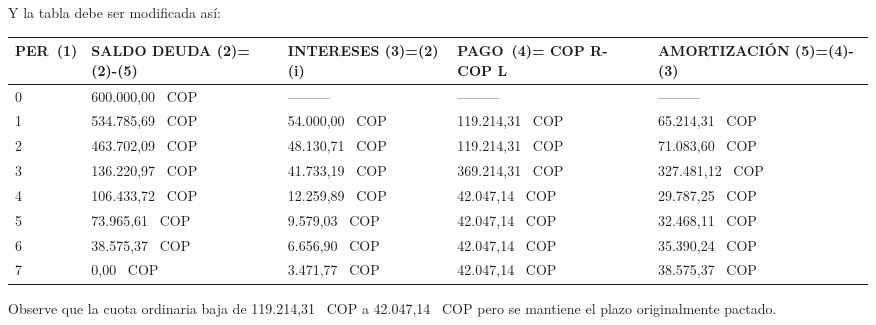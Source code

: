 

Y la tabla debe ser modificada así:

\begin{spacing}{1.1}
	\begin{center}
		\begin{tabular}{|p{1cm}|p{2cm}|p{2cm}|p{2cm}|p{3cm}|}
			\hline
			\textbf{PER\ (1)} & \textbf{SALDO DEUDA (2)=(2)-(5)} & \textbf{INTERESES  (3)=(2)(i)} & \textbf{PAGO\ (4)= COP  R- COP  L } & \textbf{AMORTIZACIÓN  (5)=(4)-(3)} \\ \hline
			
			0                 &  600.000,00 \ COP                     & ---------                       & ---------                   & ---------                          \\ \hline
			1                 &  534.785,69 \ COP                     &  54.000,00 \ COP                    &  119.214,31 \ COP                &  65.214,31 \ COP                        \\ \hline
			2                 &  463.702,09 \ COP                     &  48.130,71 \ COP                    &  119.214,31 \ COP                &  71.083,60 \ COP                        \\ \hline
			3                 &  136.220,97 \ COP                     &  41.733,19 \ COP                     &  369.214,31 \ COP                &  327.481,12 \ COP                       \\ \hline
			4                 &  106.433,72 \ COP                     &  12.259,89 \ COP                     &  42.047,14 \ COP                 &  29.787,25 \ COP                        \\ \hline
			5                 &  73.965,61 \ COP                      &  9.579,03 \ COP                      &  42.047,14 \ COP                 &  32.468,11 \ COP                        \\ \hline
			6                 &  38.575,37 \ COP                      &  6.656,90 \ COP                      &  42.047,14 \ COP                 &  35.390,24 \ COP                        \\ \hline
			7                 &  0,00 \ COP                           &  3.471,77 \ COP                      &  42.047,14 \ COP                 &  38.575,37 \ COP                        \\ \hline
		\end{tabular}
	\end{center}
\end{spacing}

Observe que la cuota ordinaria baja de  119.214,31 \ COP a  42.047,14 \ COP pero se mantiene el plazo originalmente pactado.\\

